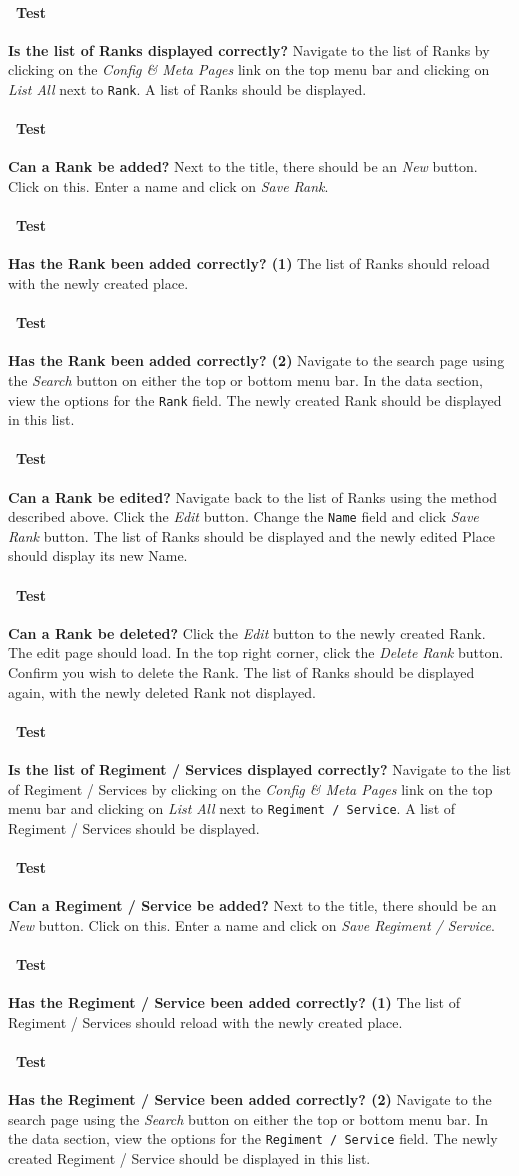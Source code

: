 \documentclass[12pt]{article}
\newcounter{Test}
\newcommand{\test}[1]{%
\stepcounter{Test}%
\paragraph{\Circle\ Test \theTest} \textbf{#1} }
\begin{document}
\test{Is the list of Ranks displayed correctly?}
Navigate to the list of Ranks by clicking on the \textit{Config \& Meta Pages} link on the top menu bar and clicking on \textit{List All} next to \texttt{Rank}. A list of Ranks should be displayed.

\test{Can a Rank be added?}
Next to the title, there should be an \textit{New} button. Click on this. Enter a name and click on \textit{Save Rank}.

\test{Has the Rank been added correctly? (1)}
The list of Ranks should reload with the newly created place.

\test{Has the Rank been added correctly? (2)}
Navigate to the search page using the \textit{Search} button on either the top or bottom menu bar. In the data section, view the options for the \texttt{Rank} field. The newly created Rank should be displayed in this list.

\test{Can a Rank be edited?}
Navigate back to the list of Ranks using the method described above. Click the \textit{Edit} button. Change the \texttt{Name} field and click \textit{Save Rank} button. The list of Ranks should be displayed and the newly edited Place should display its new Name.

\test{Can a Rank be deleted?}
Click the \textit{Edit} button to the newly created Rank. The edit page should load. In the top right corner, click the \textit{Delete Rank} button. Confirm you wish to delete the Rank. The list of Ranks should be displayed again, with the newly deleted Rank not displayed.

\test{Is the list of Regiment / Services displayed correctly?}
Navigate to the list of Regiment / Services by clicking on the \textit{Config \& Meta Pages} link on the top menu bar and clicking on \textit{List All} next to \texttt{Regiment / Service}. A list of Regiment / Services should be displayed.

\test{Can a Regiment / Service be added?}
Next to the title, there should be an \textit{New} button. Click on this. Enter a name and click on \textit{Save Regiment / Service}.

\test{Has the Regiment / Service been added correctly? (1)}
The list of Regiment / Services should reload with the newly created place.

\test{Has the Regiment / Service been added correctly? (2)}
Navigate to the search page using the \textit{Search} button on either the top or bottom menu bar. In the data section, view the options for the \texttt{Regiment / Service} field. The newly created Regiment / Service should be displayed in this list.
\end{document}
